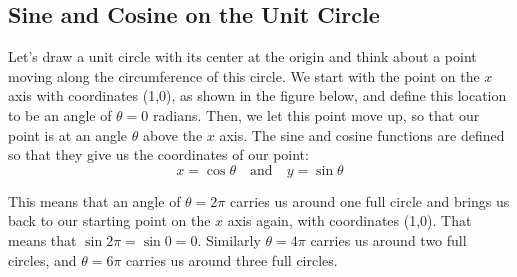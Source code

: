 \subsection*{Sine and Cosine on the Unit Circle}

Let's draw a unit circle with its center at the origin and think about a point moving along the circumference of this circle.  We start with the point on the $x$ axis with coordinates (1,0), as shown in the figure below, and define this location to be an angle of $\theta = 0$ radians.  Then, we let this point move up, so that our point is at an angle $\theta$ above the $x$ axis.  The sine and cosine functions are defined so that they give us the coordinates of our point:   
\[ x = \cos \theta \quad \text{and} \quad y = \sin \theta \]


\begin{center}
\end{center}


This means that an angle of $\theta = 2 \pi$ carries us around one full circle and brings
us back to our starting point on the $x$ axis again, with coordinates (1,0).  That means
that $\sin 2 \pi = \sin 0 = 0$.  Similarly $\theta = 4 \pi$ carries us around two full
circles, and $\theta = 6 \pi$ carries us around three full circles. 

